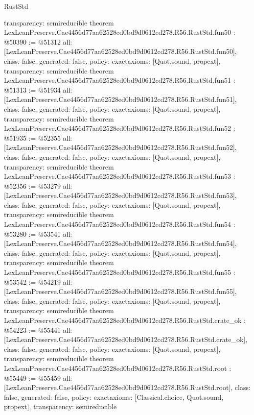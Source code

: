 \begin{lexlean}{RustStd}
\begin{coremodule}
{  transparency: semireducible
}
theorem LexLeanPreserve.Cae4456d77aa62528ed0bd9d0612cd278.R56.RustStd.fun50 : @50390 := @51312 {
  all: [LexLeanPreserve.Cae4456d77aa62528ed0bd9d0612cd278.R56.RustStd.fun50],
  class: false,
  generated: false,
  policy: exact{axioms: [Quot.sound, propext]},
  transparency: semireducible
}
theorem LexLeanPreserve.Cae4456d77aa62528ed0bd9d0612cd278.R56.RustStd.fun51 : @51313 := @51934 {
  all: [LexLeanPreserve.Cae4456d77aa62528ed0bd9d0612cd278.R56.RustStd.fun51],
  class: false,
  generated: false,
  policy: exact{axioms: [Quot.sound, propext]},
  transparency: semireducible
}
theorem LexLeanPreserve.Cae4456d77aa62528ed0bd9d0612cd278.R56.RustStd.fun52 : @51935 := @52355 {
  all: [LexLeanPreserve.Cae4456d77aa62528ed0bd9d0612cd278.R56.RustStd.fun52],
  class: false,
  generated: false,
  policy: exact{axioms: [Quot.sound, propext]},
  transparency: semireducible
}
theorem LexLeanPreserve.Cae4456d77aa62528ed0bd9d0612cd278.R56.RustStd.fun53 : @52356 := @53279 {
  all: [LexLeanPreserve.Cae4456d77aa62528ed0bd9d0612cd278.R56.RustStd.fun53],
  class: false,
  generated: false,
  policy: exact{axioms: [Quot.sound, propext]},
  transparency: semireducible
}
theorem LexLeanPreserve.Cae4456d77aa62528ed0bd9d0612cd278.R56.RustStd.fun54 : @53280 := @53541 {
  all: [LexLeanPreserve.Cae4456d77aa62528ed0bd9d0612cd278.R56.RustStd.fun54],
  class: false,
  generated: false,
  policy: exact{axioms: [Quot.sound, propext]},
  transparency: semireducible
}
theorem LexLeanPreserve.Cae4456d77aa62528ed0bd9d0612cd278.R56.RustStd.fun55 : @53542 := @54219 {
  all: [LexLeanPreserve.Cae4456d77aa62528ed0bd9d0612cd278.R56.RustStd.fun55],
  class: false,
  generated: false,
  policy: exact{axioms: [Quot.sound, propext]},
  transparency: semireducible
}
theorem LexLeanPreserve.Cae4456d77aa62528ed0bd9d0612cd278.R56.RustStd.crate_ok : @54223 := @55441 {
  all: [LexLeanPreserve.Cae4456d77aa62528ed0bd9d0612cd278.R56.RustStd.crate_ok],
  class: false,
  generated: false,
  policy: exact{axioms: [Quot.sound, propext]},
  transparency: semireducible
}
theorem LexLeanPreserve.Cae4456d77aa62528ed0bd9d0612cd278.R56.RustStd.root : @55449 := @55459 {
  all: [LexLeanPreserve.Cae4456d77aa62528ed0bd9d0612cd278.R56.RustStd.root],
  class: false,
  generated: false,
  policy: exact{axioms: [Classical.choice, Quot.sound, propext]},
  transparency: semireducible
}


\end{coremodule}
\end{lexlean}
